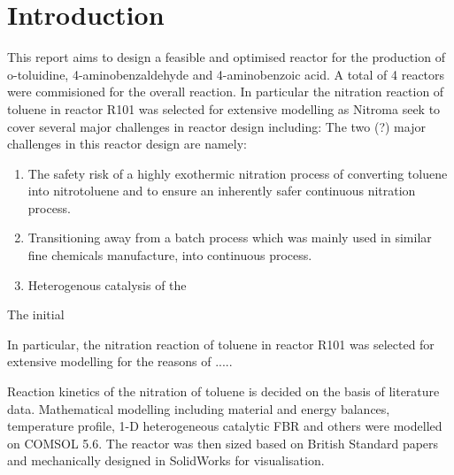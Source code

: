 \section{Introduction}
This report aims to design a feasible and optimised reactor for the production of o-toluidine, 4-aminobenzaldehyde and 4-aminobenzoic acid. A total of 4 reactors were commisioned for the overall reaction. 
In particular the nitration reaction of toluene in reactor R101 was selected for extensive modelling as Nitroma seek to cover several major challenges in reactor design including:
The two (?) major challenges in this reactor design are namely:
\begin{enumerate}
    \item The safety risk of a highly exothermic nitration process of converting toluene into nitrotoluene and to ensure an inherently safer continuous nitration process. 
    \item Transitioning away from a batch process which was mainly used in similar fine chemicals manufacture, into continuous process. 
    \item Heterogenous catalysis of the 
\end{enumerate}
The initial 

In particular, the nitration reaction of toluene in reactor R101 was selected for extensive modelling for the reasons of .....

Reaction kinetics of the nitration of toluene is decided on the basis of literature data. Mathematical modelling including material and energy balances, temperature profile, 1-D heterogeneous catalytic FBR and others were modelled on COMSOL 5.6. The reactor was then sized based on British Standard papers and mechanically designed in SolidWorks for visualisation. 



